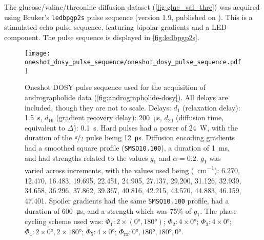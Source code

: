 

The glucose/valine/threonine diffusion dataset (\cref{fig:gluc_val_thre})
was acquired using Bruker's \texttt{ledbpgp2s} pulse sequence (version 1.9, published on
). This is a stimulated echo pulse sequence, featuring
bipolar gradients and a \ac{LED} component\cite{Wu1995}. The pulse sequence is
displayed in \cref{fig:ledbpgp2s}.

\begin{figure}[H]
    \centering
    \texttt{[image: oneshot\_dosy\_pulse\_sequence/oneshot\_dosy\_pulse\_sequence.pdf]}
    \caption[
        Oneshot \acs{DOSY} pulse sequence used for the acquisition of
        andrographolide data.
    ]{
        Oneshot \ac{DOSY} pulse sequence used for the acquisition of
        andrographolide data (\cref{fig:andrographolide-dosy}). All
        delays are included, though they are not to scale.
        Delays:
        $d_1$ (relaxation delay): \qty{1.5}{\second},
        $d_{16}$ (gradient recovery delay): \qty{200}{\micro\second},
        $d_{20}$ (diffusion time, equivalent to $\Delta$): \qty{0.1}{\second}.
        Hard pulses had a power of \qty{24}{\watt},
        with the duration of the $\nicefrac{\pi}{2}$ pulse being
        \qty{12}{\micro\second}.
        Diffusion encoding gradients had a smoothed square profile
        (\texttt{SMSQ10.100}), a duration of \qty{1}{\milli\second}, and had
        strengths related to the values $g_1$ and $\alpha = 0.2$.
        $g_1$ was varied across increments, with the values used
        being (\unit{\gauss \per \centi \meter}):
        6.270,
        12.470,
        16.483,
        19.695,
        22.451,
        24.905,
        27.137,
        29.200,
        31.126,
        32.939,
        34.658,
        36.296,
        37.862,
        39.367,
        40.816,
        42.215,
        43.570,
        44.883,
        46.159,
        47.401.
        Spoiler gradients had the same \texttt{SMSQ10.100} profile, had a
        duration of \qty{600}{\micro\second}, and a strength which was 75\% of
        $g_1$.
        The phase cycling scheme used was:
        $\Phi_1: 2 \times (\ang{0}, \ang{180})$;
        $\Phi_2: 4 \times \ang{0}$;
        $\Phi_3: 4 \times \ang{0}$;
        $\Phi_4: 2 \times \ang{0}, 2 \times \ang{180}$;
        $\Phi_5: 4 \times \ang{0}$;
        $\Phi_{\text{rx}}: \ang{0}, \ang{180}, \ang{180}, \ang{0}$.
    }
    \label{fig:oneshot-dosy}
\end{figure}

